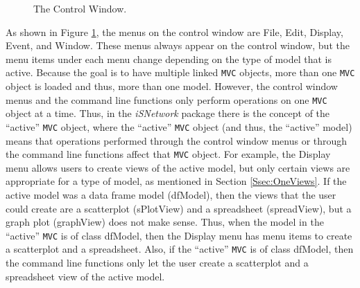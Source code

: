 \documentclass{article}[11pt]
\newcommand{\Robject}[1]{{\texttt{#1}}}
\newcommand{\Rpackage}[1]{{\textit{#1}}}
\newcommand{\Rclass}[1]{\textsf{#1}}
\begin{document}
\begin{figure}[ht]
  \begin{center}
    \caption{ The Control Window. }
    \label{Fig:ContWin}
  \end{center}
\end{figure}

As shown in Figure \ref{Fig:ContWin}, the menus on the control window are
File, Edit, Display, Event, and Window.  These menus always appear on the
control window, but the menu items under each menu change depending on
the type of model that is active.  Because the goal is to have multiple
linked \Robject{MVC} objects, more than one \Robject{MVC} object is loaded and
thus, more than one model. However, the control window menus and the command
line functions only perform operations on one \Robject{MVC} object at a time.
Thus, in the \Rpackage{iSNetwork} package there is the concept of the
``active'' \Robject{MVC} object, where the ``active'' \Robject{MVC} object
(and thus, the ``active'' model) means that operations performed through the
control window menus or through the command line functions affect that
\Robject{MVC} object.  For example, the Display menu allows users to create
views of the active model, but only certain views are appropriate for a type
of model, as mentioned in 
Section \ref{Ssec:OneViews}.  If the active model was a data frame model
(\Rclass{dfModel}), then the views that the user could create are a
scatterplot (\Rclass{sPlotView}) and a spreadsheet (\Rclass{spreadView}),
but a graph plot (\Rclass{graphView}) does not make sense.  Thus, when the
model in the ``active'' \Robject{MVC} is of class \Rclass{dfModel}, then the
Display 
menu has menu items to create a scatterplot and a spreadsheet.  Also, if
the ``active'' \Robject{MVC} is of class \Rclass{dfModel}, then the command
line functions only let the user create a scatterplot and a spreadsheet view
of the active model.
\end{document}
